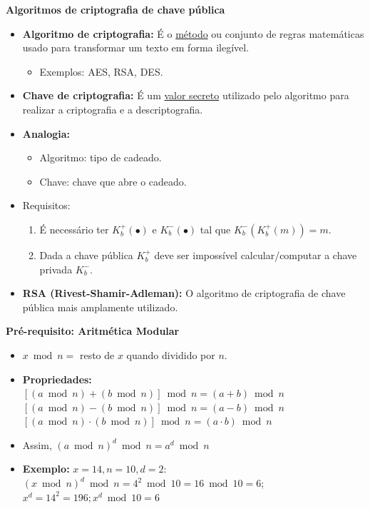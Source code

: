     \textbf{Algoritmos de criptografia de chave pública}
    \begin{itemize}[left=0.5cm, align=left, nosep]    
        \item \textbf{Algoritmo de criptografia:} É o \underline{método} ou conjunto de regras matemáticas usado para transformar um texto em forma ilegível.    
        \begin{itemize}[left=0.5cm, nosep, label=$\hookrightarrow$]
            \item Exemplos: AES, RSA, DES.
        \end{itemize}          
        \item \textbf{Chave de criptografia:} É um \underline{valor secreto} utilizado pelo algoritmo para realizar a criptografia e a descriptografia.  
        \item \textbf{Analogia:}
        \begin{itemize}[left=0.5cm, nosep, label=$\hookrightarrow$]
            \item Algoritmo: tipo de cadeado.
            \item Chave: chave que abre o cadeado.
        \end{itemize}
        
        \item Requisitos:
        \begin{enumerate}[left=0.5cm, align=left, nosep]
            \item É necessário ter $K_{b}^{+}(\bullet) \text{ e } K_{b}^{-} (\bullet)$ tal que $K_{b}^{-} (K_{b}^{+} (m)) = m$.
            \item Dada a chave pública $K_{b}^{+}$ deve ser impossível calcular/computar a chave privada $K_{b}^{-}$. 
        \end{enumerate}
    
        \item \textbf{RSA (Rivest-Shamir-Adleman):} O algoritmo de criptografia de chave pública mais amplamente utilizado.
    \end{itemize}  

    \textbf{Pré-requisito: Aritmética Modular}
    \begin{itemize}[left=0.5cm, align=left, nosep]    
        \item $x \bmod n =$ resto de $x$ quando dividido por $n$.   
        \item \textbf{Propriedades:} \\
        $[(a \bmod n) + (b \bmod n)] \bmod n = (a + b) \bmod n$ \\
        $[(a \bmod n) - (b \bmod n)] \bmod n = (a - b) \bmod n$ \\
        $[(a \bmod n) \cdot (b \bmod n)] \bmod n = (a \cdot b) \bmod n$ 
        \item Assim, $(a \bmod n)^{d}  \bmod n = a^d \bmod n$
        \item \textbf{Exemplo:} $x = 14, n = 10, d = 2$: \\
        $(x \bmod n)^{d} \bmod n = 4^{2} \bmod 10 = 16 \bmod 10 = 6$; \\
        $x^{d} = 14^{2} = 196; x^{d} \bmod 10 = 6$ 
    \end{itemize}

